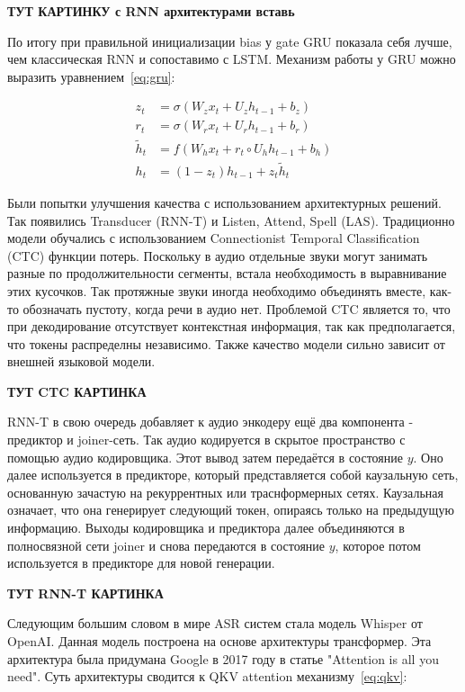 \textbf{ТУТ КАРТИНКУ с RNN архитектурами вставь}

По итогу при правильной инициализации bias у gate GRU показала себя лучше, чем классическая RNN и сопоставимо с LSTM.
Механизм работы у GRU можно выразить уравнением~\ref{eq:gru}:

\begin{equation}
  \begin{aligned}
    z_t &= \sigma(W_z x_t + U_z h_{t-1} + b_z) \\
    r_t &= \sigma(W_r x_t + U_r h_{t-1} + b_r) \\
    \tilde{h}_t &= f(W_h x_t + r_t \circ U_h h_{t-1} + b_h) \\
    h_t &= (1 - z_t) h_{t-1} + z_t \tilde{h}_t
  \end{aligned}
  \label{eq:gru}
\end{equation}

Были попытки улучшения качества с использованием архитектурных решений.
Так появились Transducer (RNN-T) и Listen, Attend, Spell (LAS).
Традиционно модели обучались с использованием Connectionist Temporal Classification (CTC) функции потерь.
Поскольку в аудио отдельные звуки могут занимать разные по продолжительности сегменты, встала необходимость в выравнивание этих кусочков.
Так протяжные звуки иногда необходимо объединять вместе, как-то обозначать пустоту, когда речи в аудио нет.
Проблемой CTC является то, что при декодирование отсутствует контекстная информация, так как предполагается, что токены распределны независимо.
Также качество модели сильно зависит от внешней языковой модели.

\textbf{ТУТ CTC КАРТИНКА}

RNN-T в свою очередь добавляет к аудио энкодеру ещё два компонента - предиктор и joiner-сеть.
Так аудио кодируется в скрытое пространство с помощью аудио кодировщика.
Этот вывод затем передаётся в состояние $y$.
Оно далее используется в предикторе, который представляется собой каузальную сеть, основанную зачастую на рекуррентных или траснформерных сетях.
Каузальная означает, что она генерирует следующий токен, опираясь только на предыдущую информацию.
Выходы кодировщика и предиктора далее объединяются в полносвязной сети joiner и снова передаются в состояние $y$, которое потом используется в предикторе для новой генерации.

\textbf{ТУТ RNN-T КАРТИНКА}

Следующим большим словом в мире ASR систем стала модель Whisper от OpenAI.
Данная модель построена на основе архитектуры трансформер.
Эта архитектура была придумана Google в 2017 году в статье "Attention is all you need".
Суть архитектуры сводится к QKV attention механизму~\ref{eq:qkv}:

